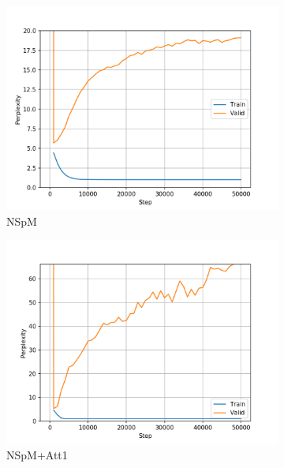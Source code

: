\begin{figure}[H]
\centering
\begin{subfigure}{0.45\textwidth}
\includegraphics[width=\textwidth]{../results/lc-quad1/run1/neural_sparql_machine/ppls.png} 
\caption{NSpM}
\label{fig:lcquad nsm ppl}
\end{subfigure}
\hfill
\begin{subfigure}{0.45\textwidth}
\includegraphics[width=\textwidth]{../results/lc-quad1/run1/neural_sparql_machine_bahdanau_attention/ppls.png}
\caption{NSpM+Att1}
\label{fig:lcquad nsm-bah ppl}
\end{subfigure}
\hfill
\begin{subfigure}{0.45\textwidth}

\end{subfigure}
\end{figure}
